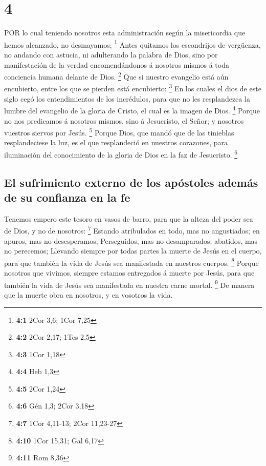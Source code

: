 \hypertarget{section-3}{%
\section{4}\label{section-3}}

 POR lo cual teniendo nosotros esta administración según la
misericordia que hemos alcanzado, no desmayamos; \footnote{\textbf{4:1}
  2Cor 3,6; 1Cor 7,25}  Antes quitamos los escondrijos de
vergüenza, no andando con astucia, ni adulterando la palabra de Dios,
sino por manifestación de la verdad encomendándonos á nosotros mismos á
toda conciencia humana delante de Dios. \footnote{\textbf{4:2} 2Cor
  2,17; 1Tes 2,5}  Que si nuestro evangelio está aún
encubierto, entre los que se pierden está encubierto: \footnote{\textbf{4:3}
  1Cor 1,18}  En los cuales el dios de este siglo cegó los
entendimientos de los incrédulos, para que no les resplandezca la lumbre
del evangelio de la gloria de Cristo, el cual es la imagen de Dios.
\footnote{\textbf{4:4} Heb 1,3}  Porque no nos predicamos á
nosotros mismos, sino á Jesucristo, el Señor; y nosotros vuestros
siervos por Jesús. \footnote{\textbf{4:5} 2Cor 1,24}  Porque
Dios, que mandó que de las tinieblas resplandeciese la luz, es el que
resplandeció en nuestros corazones, para iluminación del conocimiento de
la gloria de Dios en la faz de Jesucristo. \footnote{\textbf{4:6} Gén
  1,3; 2Cor 3,18}

\hypertarget{el-sufrimiento-externo-de-los-apuxf3stoles-ademuxe1s-de-su-confianza-en-la-fe}{%
\subsection{El sufrimiento externo de los apóstoles además de su
confianza en la
fe}\label{el-sufrimiento-externo-de-los-apuxf3stoles-ademuxe1s-de-su-confianza-en-la-fe}}

 Tenemos empero este tesoro en vasos de barro, para que la
alteza del poder sea de Dios, y no de nosotros: \footnote{\textbf{4:7}
  1Cor 4,11-13; 2Cor 11,23-27}  Estando atribulados en todo,
mas no angustiados; en apuros, mas no desesperamos; 
Perseguidos, mas no desamparados; abatidos, mas no perecemos;
 Llevando siempre por todas partes la muerte de Jesús en el
cuerpo, para que también la vida de Jesús sea manifestada en nuestros
cuerpos. \footnote{\textbf{4:10} 1Cor 15,31; Gal 6,17} 
Porque nosotros que vivimos, siempre estamos entregados á muerte por
Jesús, para que también la vida de Jesús sea manifestada en nuestra
carne mortal. \footnote{\textbf{4:11} Rom 8,36}  De manera
que la muerte obra en nosotros, y en vosotros la vida.

